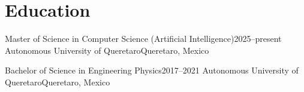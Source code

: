 \section{Education}
    \resumeSubHeadingListStart
    \resumeSubheading
    {Master of Science in Computer Science (Artificial Intelligence)}{2025--present}
    {Autonomous University of Queretaro}{Queretaro, Mexico}
    \resumeItemListStart
    \resumeItemListEnd

    \resumeSubheading
    {Bachelor of Science in Engineering Physics}{2017--2021}
    {Autonomous University of Queretaro}{Queretaro, Mexico}
    \resumeItemListStart
    \resumeItemListEnd
    \resumeSubHeadingListEnd
